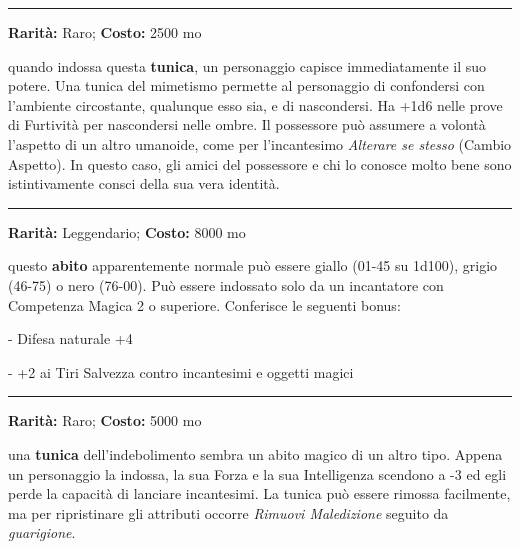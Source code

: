 \begin{multicols}{2}
\smallskip\noindent\rule{\linewidth}{2pt}  \hypertarget{TunicadelMimetismo}{}\smallskip{}\noindent\label{TunicadelMimetismo}

\textbf{Rarità:} Raro; \textbf{Costo:} 2500 mo

quando indossa questa \textbf{tunica}, un personaggio capisce immediatamente il suo potere. Una tunica del mimetismo permette al personaggio di confondersi con l'ambiente circostante, qualunque esso sia, e di nascondersi. Ha +1d6 nelle prove di Furtività per nascondersi nelle ombre. Il possessore può assumere a volontà l'aspetto di un altro umanoide, come per l'incantesimo \emph{Alterare se stesso} (Cambio Aspetto). In questo caso, gli amici del possessore e chi lo conosce molto bene sono istintivamente consci della sua vera identità.

\smallskip\noindent\rule{\linewidth}{2pt}  \hypertarget{Tunicadell'Arcimago}{}\smallskip{}\noindent\label{Tunicadell'Arcimago}

\textbf{Rarità:} Leggendario; \textbf{Costo:} 8000 mo

questo \textbf{abito} apparentemente normale può essere giallo (01-45 su 1d100), grigio (46-75) o nero (76-00). Può essere indossato solo da un incantatore con Competenza Magica 2 o superiore. Conferisce le seguenti bonus:

- Difesa naturale +4

- +2 ai Tiri Salvezza contro incantesimi e oggetti magici

\smallskip\noindent\rule{\linewidth}{2pt}  \hypertarget{Tunicadell'Indebolimento}{}\smallskip{}\noindent\label{Tunicadell'Indebolimento}

\textbf{Rarità:} Raro; \textbf{Costo:} 5000 mo

una \textbf{tunica} dell'indebolimento sembra un abito magico di un altro tipo. Appena un personaggio la indossa, la sua Forza e la sua Intelligenza scendono a -3 ed egli perde la capacità di lanciare incantesimi. La tunica può essere rimossa facilmente, ma per ripristinare gli attributi occorre \emph{Rimuovi Maledizione} seguito da \emph{guarigione}.


\end{multicols}
